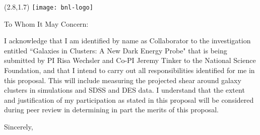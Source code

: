 \documentclass[12pt]{letter}
\begin{document}
\begin{textblock}{2}(2.8,1.7)
\texttt{[image: bnl-logo]}
\end{textblock}

\begin{letter}{}

\opening{To Whom It May Concern:}

I acknowledge that I am identified by name as Collaborator to the investigation
entitled ``Galaxies in Clusters: A New Dark Energy Probe" that is being
submitted by PI Risa Wechsler and Co-PI Jeremy Tinker to the National Science
Foundation, and that I intend to carry out all responsibilities identified for
me in this proposal. This will include measuring the projected shear around
galaxy clusters in simulations and SDSS and DES data.  I understand that the
extent and justification of my participation as stated in this proposal will be
considered during peer review in determining in part the merits of this
proposal.

\closing{Sincerely,}

\end{letter}
\end{document}

